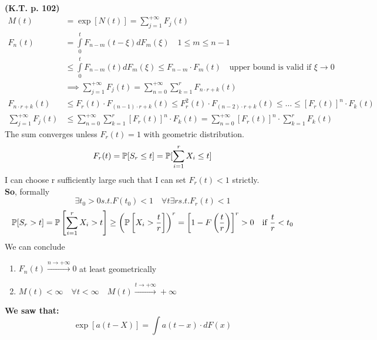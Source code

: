  \textbf{(K.T. p. 102)}
\begin{equation}
  \begin{split}
    M(t) &= \exp[N(t)] = \sum\limits_{j=1}^{+\infty}F_j(t) \\
    F_n(t) &= \int\limits_0^t F_{n-m}(t-\xi) dF_m(\xi) \quad 1 \le m \le n-1\\
    & \le \int\limits_0^t F_{n-m}(t) dF_m(\xi) \le F_{n-m} \cdot F_m(t) \quad \text{upper bound is valid if }\xi \to 0 \\
    &\implies  \sum\limits_{j=1}^{+\infty}F_j(t)= \sum\limits_{n=0}^{+\infty} \sum\limits_{k=1}^{r}F_{n \cdot r + k}(t) \\
    F_{n \cdot r + k} (t) &\le F_r(t) \cdot F_{(n-1)\cdot r + k}(t) \le F_r^2(t) \cdot F_{(n-2)\cdot r +k}(t) \le \dots
    \le \left[F_r(t)\right]^n \cdot F_k(t)\\
    \sum\limits_{j=1}^{+\infty}F_j(t) &\le \sum\limits_{n=0}^{+\infty} \sum\limits_{k=1}^{r}\left[F_r(t)\right]^n \cdot F_k(t)
    = \sum\limits_{n=0}^{+\infty} \left[F_r(t)\right]^n \cdot \sum\limits_{k=1}^{r}F_k(t)
  \end{split}
\end{equation}
The sum converges unless $F_r(t)=1$ with geometric distribution.
\begin{equation}
  F_r(t)=\mathbb{P}[S_r\le t]=\mathbb{P}[\sum\limits_{i=1}^r X_i \le t]
\end{equation}
I can choose r sufficiently large such that I can set $F_r(t)<1$ strictly. \\
\textbf{So}, formally
\begin{equation*}
  \exists t_0 >0 s.t. F(t_0)<1 \quad \forall t \exists r s.t. F_r(t)<1
\end{equation*}
\begin{equation*}
  \mathbb{P}[S_r >t] = \mathbb{P}\left[\sum\limits_{i=1}^r X_i > t \right] \ge
  \left(\mathbb{P}\left[X_i > \frac{t}{r}\right]\right)^r = \left[1-F\left(\frac{t}{r}\right)\right]^r>0
  \quad \text{if }\frac{t}{r}<t_0
\end{equation*}
We can conclude
\begin{enumerate}
  \item $F_n(t)\xrightarrow{n\to +\infty}0$ at least geometrically
  \item $M(t)<\infty \quad \forall t < \infty \quad M(t)\xrightarrow{t \to +\infty}+\infty$
\end{enumerate}

\textbf{We saw that:}
$$\exp[a(t-X)]=\int a(t-x)\cdot dF(x)$$

